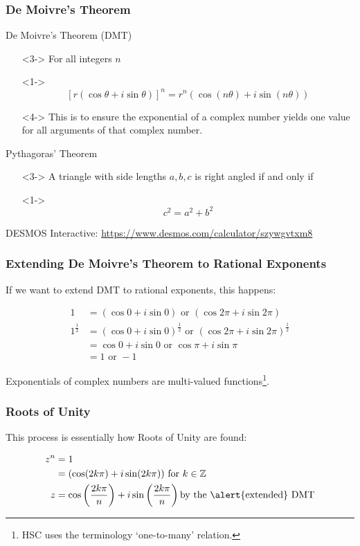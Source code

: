 \documentclass{beamer}
\begin{document}
\begin{frame}
\frametitle{De Moivre's Theorem}
\begin{block}{De Moivre's Theorem (DMT)\\\parencite{syllabus}}
  \begin{itemize}
    \item[]<3-> For all \alert{integers $n$}
    \item[]<1-> \[[r(\cos\theta + i \sin\theta)]^n = r^n(\cos(n\theta) + i\sin(n\theta))\]
    \item[]<4-> This is to ensure the exponential of a complex number yields one value for all arguments of that complex number.
  \end{itemize}
  \end{block}
  \pause
  \begin{block}{Pythagoras' Theorem}
  \begin{itemize}
    \item[]<3-> A triangle with side lengths $a,b,c$ is right angled if and only if
    \item[]<1-> \[c^2 = a^2 + b^2\]
  \end{itemize}
\end{block}
\pause
DESMOS Interactive: \url{https://www.desmos.com/calculator/szywgvtxm8}
\end{frame}

\begin{frame}
\frametitle{Extending De Moivre's Theorem to Rational Exponents}
If we want to extend DMT to rational exponents, this happens:
\begin{example}
  \begin{align*}
    1 & = (\cos 0 + i \sin 0) \mbox{ or } (\cos 2\pi + i\sin 2 \pi)\\
    1^\frac{1}{2} & = (\cos 0 + i \sin 0)^\frac{1}{2} \mbox{ or }(\cos 2\pi + i\sin 2 \pi)^\frac{1}{2}\\
                  & = \cos 0 + i \sin 0 \mbox{ or } \cos \pi + i \sin \pi\\
                  & = 1 \mbox{ or } -1
  \end{align*}
\end{example}
\pause
Exponentials of complex numbers are \alert{multi-valued} functions\footnote<2->{HSC uses the terminology `one-to-many' relation.}.
\end{frame}

\begin{frame}
  \frametitle{Roots of Unity}
  This process is essentially how Roots of Unity are found:
  \begin{example}
    \begin{align*}
      z^n & = 1\\
          & = (\cos (2k\pi) + i\sin (2k\pi)) \mbox{ for } k \in \mathbb{Z}\\
      z & = \cos\left(\frac{2k\pi}{n}\right) + i\sin \left(\frac{2k\pi}{n}\right) \mbox{by the \alert{extended} DMT}
    \end{align*}
  \end{example}
\end{frame}
\end{document}
